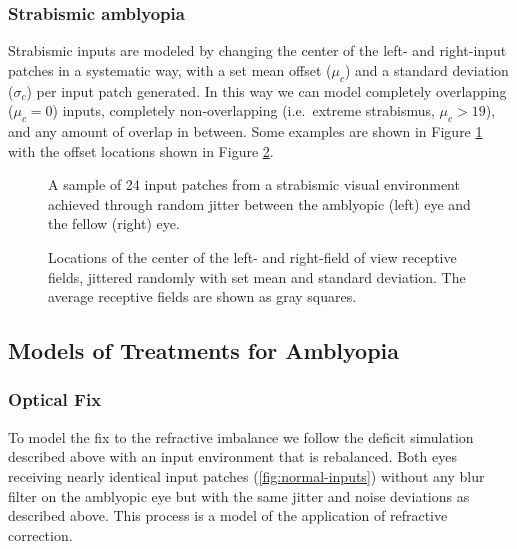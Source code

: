 \documentclass[
  onecolumn]{article}
\begin{document}
\hypertarget{strabismic-amblyopia}{%
\subsubsection{Strabismic amblyopia}\label{strabismic-amblyopia}}

Strabismic inputs are modeled by changing the center of the left- and
right-input patches in a systematic way, with a set mean offset
(\(\mu_c\)) and a standard deviation (\(\sigma_c\)) per input patch
generated. In this way we can model completely overlapping (\(\mu_c=0\))
inputs, completely non-overlapping (i.e.~extreme strabismus,
\(\mu_c>19\)), and any amount of overlap in between. Some examples are
shown in Figure \ref{fig:jitter-inputs} with the offset locations shown
in Figure \ref{fig:jitter-input-locations}.

\begin{figure}
\hypertarget{fig:jitter-inputs}{%
\centering

\caption{A sample of 24 input patches from a strabismic visual
environment achieved through random jitter between the amblyopic (left)
eye and the fellow (right) eye.}\label{fig:jitter-inputs}
}
\end{figure}

\begin{figure}
\hypertarget{fig:jitter-input-locations}{%
\centering

\caption{Locations of the center of the left- and right-field of view
receptive fields, jittered randomly with set mean and standard
deviation. The average receptive fields are shown as gray
squares.}\label{fig:jitter-input-locations}
}
\end{figure}

\hypertarget{models-of-treatments-for-amblyopia}{%
\subsection{Models of Treatments for
Amblyopia}\label{models-of-treatments-for-amblyopia}}

\hypertarget{optical-fix}{%
\subsubsection{Optical Fix}\label{optical-fix}}

To model the fix to the refractive imbalance we follow the deficit
simulation described above with an input environment that is rebalanced.
Both eyes receiving nearly identical input patches
(\ref{fig:normal-inputs}) without any blur filter on the amblyopic eye
but with the same jitter and noise deviations as described above. This
process is a model of the application of refractive correction.
\end{document}
